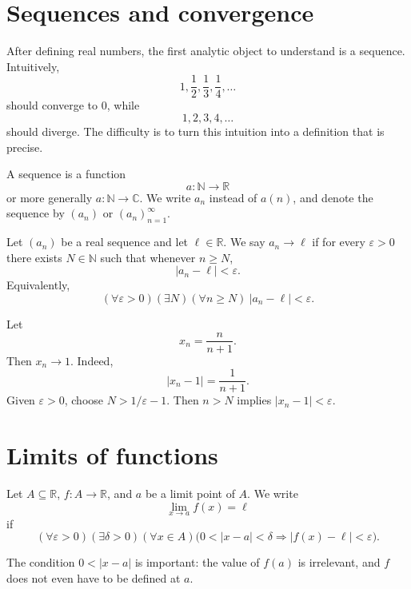 
\section{Sequences and convergence}

After defining real numbers, the first analytic object to understand is a sequence.  Intuitively,
\[
  1,\frac12,\frac13,\frac14,\dots
\]
should converge to \(0\), while
\[
  1,2,3,4,\dots
\]
should diverge.  The difficulty is to turn this intuition into a definition that is precise.

\begin{definition}
A sequence is a function
\[
  a:\mathbb N\to\mathbb R
\]
or more generally \(a:\mathbb N\to\mathbb C\).  We write \(a_n\) instead of \(a(n)\), and denote the sequence by \((a_n)\) or \((a_n)_{n=1}^\infty\).
\end{definition}

\begin{definition}
Let \((a_n)\) be a real sequence and let \(\ell\in\mathbb R\).  We say \(a_n\to\ell\) if for every \(\varepsilon>0\) there exists \(N\in\mathbb N\) such that whenever \(n\ge N\),
\[
  |a_n-\ell|<\varepsilon.
\]
Equivalently,
\[
  (\forall\varepsilon>0)(\exists N)(\forall n\ge N)\ |a_n-\ell|<\varepsilon.
\]
\end{definition}

\begin{example}
Let
\[
  x_n=\frac{n}{n+1}.
\]
Then \(x_n\to1\).  Indeed,
\[
  |x_n-1|=\frac{1}{n+1}.
\]
Given \(\varepsilon>0\), choose \(N>1/\varepsilon-1\).  Then \(n>N\) implies \(|x_n-1|<\varepsilon\).
\end{example}

\section{Limits of functions}

\begin{definition}
Let \(A\subseteq\mathbb R\), \(f:A\to\mathbb R\), and \(a\) be a limit point of \(A\).  We write
\[
  \lim_{x\to a}f(x)=\ell
\]
if
\[
  (\forall\varepsilon>0)(\exists\delta>0)(\forall x\in A)
  \bigl(0<|x-a|<\delta\Rightarrow |f(x)-\ell|<\varepsilon\bigr).
\]
\end{definition}

The condition \(0<|x-a|\) is important: the value of \(f(a)\) is irrelevant, and \(f\) does not even have to be defined at \(a\).


